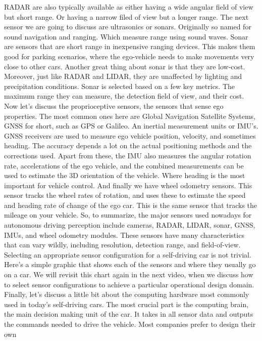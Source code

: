 RADAR are also typically available as
either having a wide angular field of view but short range. Or having a narrow filed of view but
a longer range. The next sensor we are going to
discuss are ultrasonics or sonars. Originally so named for
sound navigation and ranging. Which measure range using sound waves. Sonar are sensors that are short
range in inexpensive ranging devices. This makes them good for
parking scenarios, where the ego-vehicle needs to make
movements very close to other cars. Another great thing about sonar
is that they are low-cost. Moreover, just like RADAR and LIDAR,
they are unaffected by lighting and precipitation conditions. Sonar is selected based
on a few key metrics. The maximum range they can measure, the
detection field of view, and their cost. Now let's discuss
the proprioceptive sensors, the sensors that sense ego properties. The most common ones here
are Global Navigation Satellite Systems, GNSS for short, such as GPS or Galileo. An inertial measurement units or IMU's. GNSS receivers are used to measure
ego vehicle position, velocity, and sometimes heading. The accuracy depends a lot on
the actual positioning methods and the corrections used. Apart from these, the IMU also
measures the angular rotation rate, accelerations of the ego vehicle, and
the combined measurements can be used to estimate the 3D orientation
of the vehicle. Where heading is the most important for
vehicle control. And finally we have
wheel odometry sensors. This sensor tracks the wheel
rates of rotation, and uses these to estimate the speed and
heading rate of change of the ego car. This is the same sensor that tracks
the mileage on your vehicle. So, to summarize,
the major sensors used nowadays for autonomous driving perception
include cameras, RADAR, LIDAR, sonar, GNSS, IMUs,
and wheel odometry modules. These sensors have many
characteristics that can vary wildly, including resolution,
detection range, and field-of-view. Selecting an appropriate
sensor configuration for a self-driving car is not trivial. Here's a simple graphic that
shows each of the sensors and where they usually go on a car. We will revisit this chart again in the
next video, when we discuss how to select sensor configurations to achieve
a particular operational design domain. Finally, let's discuss a little bit about
the computing hardware most commonly used in today's self-driving cars. The most crucial part
is the computing brain, the main decision making unit of the car. It takes in all sensor data and outputs
the commands needed to drive the vehicle. Most companies prefer to design their own
